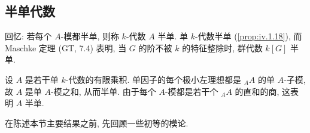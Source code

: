 \subsection*{半单代数}

回忆: 若每个 $A$-模都半单, 则称 $k$-代数 $A$ 半单. 单 $k$-代数半单 (\ref{prop:iv.1.18}), 而 Maschke 定理 (GT, 7.4) 表明, 当 $G$ 的阶不被 $k$ 的特征整除时, 群代数 $k[G]$ 半单.

\begin{example}\label{ex:iv.5.1}
设 $A$ 是若干单 $k$-代数的有限乘积. 单因子的每个极小左理想都是 ${}_A A$ 的单 $A$-子模, 故 $A$ 是单 $A$-模之和, 从而半单. 由于每个 $A$-模都是若干个 ${}_A A$ 的直和的商, 这表明 $A$ 半单.
\end{example}

在陈述本节主要结果之前, 先回顾一些初等的模论.

